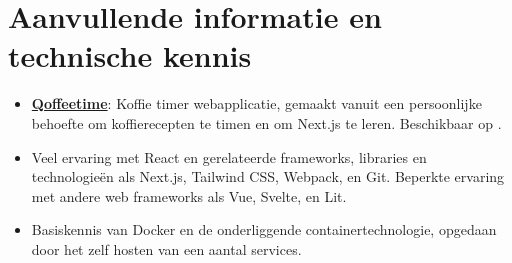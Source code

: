 \documentclass[10pt]{article}
\begin{document}
\section{Aanvullende informatie en technische kennis}
\label{sec:other}

\begin{itemize}
      \item \textbf{\underline{Qoffeetime}}: Koffie timer webapplicatie, gemaakt
            vanuit een persoonlijke behoefte om koffierecepten te timen en om Next.js te
            leren. Beschikbaar op .
      \item Veel ervaring met React en gerelateerde frameworks, libraries en
            technologieën als Next.js, Tailwind CSS, Webpack, en Git. Beperkte ervaring met
            andere web frameworks als Vue, Svelte, en Lit.
      \item Basiskennis van Docker en de onderliggende containertechnologie, opgedaan
            door het zelf hosten van een aantal services.
\end{itemize}
\end{document}
